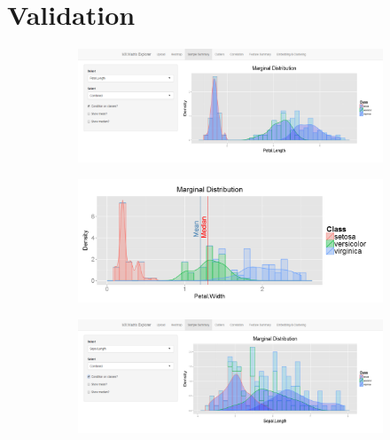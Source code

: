 \documentclass[12pt]{article}
\begin{document}
\section{Validation}
\label{sec:val}

\begin{figure}
	\centering
	\begin{subfigure}[b]{0.8\textwidth}
		\includegraphics[width=\textwidth]{Figures/Iris/MarginalPetalLength.png}
		\subcaption{}
	\end{subfigure}	
	\begin{subfigure}[b]{0.8\textwidth}
		\includegraphics[width=\textwidth]{Figures/Iris/MarginalPetalWidth.png}
		\subcaption{}
	\end{subfigure}
	\begin{subfigure}[b]{0.8\textwidth}
		\includegraphics[width=\textwidth]{Figures/Iris/MarginalSepalLength.png}
		\subcaption{}
	\end{subfigure}
	\begin{subfigure}[b]{0.8\textwidth}

\end{subfigure}
\end{figure}
\end{document}
